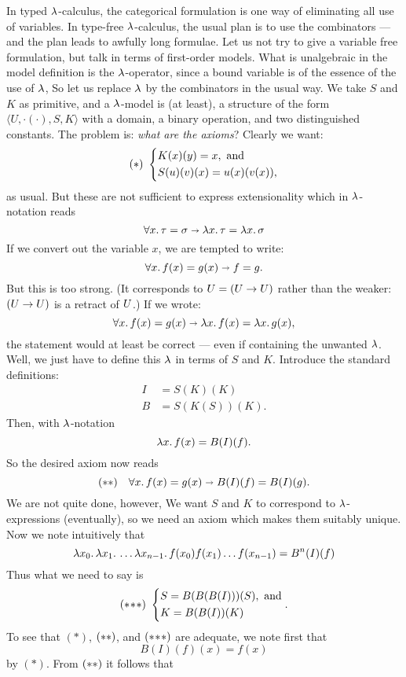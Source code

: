 In typed $\l$-calculus, the categorical formulation is one way of eliminating all use of
variables. In type-free $\l$-calculus, the usual plan is to use the combinators --- and
the plan leads to awfully long formulae. Let us not try to give a variable free
formulation, but talk in terms of first-order models. What is unalgebraic in the model
definition is the $\l$-operator, since a bound variable is of the essence of the use of
$\l$, So let us replace $\l$ by the combinators in the usual way. We take $S$ and $K$ as
primitive, and a $\l$-model is (at least), a structure of the form $\langle U,
\cdot(\cdot), S, K\rangle$ with a domain, a binary operation, and two distinguished
constants. The problem is: {\it what are the axioms}? Clearly we want:
%
\[
(*) \,\,
\begin{dcases}
K(x)(y) = x, {\textrm { and}}\\
S(u)(v)(x) = u(x)(v(x)),
\end{dcases}
\]
%
as usual. But these are not sufficient to express extensionality which in $\l$-notation
reads
$$
\forall x.\, \tau = \sigma \imp \lm{x}. \tau = \lm{x}. \sigma
$$
If we convert out the variable $x$, we are tempted to write:
$$
\forall x.\, f(x) = g(x) \imp f = g.
$$
But this is too strong. (It corresponds to $\U = (\U \to \U)$ rather than the weaker: $(\U
\to \U)$ is a retract of $\U$.) If we wrote:
$$
\forall x.\, f(x) = g(x) \imp \lm{x}.f(x) = \lm{x}.g(x),
$$
the statement would at least be correct --- even if containing the unwanted $\l$. Well, we
just have to define this $\l$ in terms of $S$ and $K$. Introduce the standard definitions:
\begin{align*}
I &= S(K)(K)\\
B &= S(K(S))(K).
\end{align*}
%
Then, with $\l$-notation
$$
\lm{x}.f(x) = B(I)(f).
$$
So the desired axiom now reads
$$
({\mathrm {**}}) \quad \forall x.\, f(x) = g(x) \imp B(I)(f) = B(I)(g).
$$
We are not quite done, however, We want $S$ and $K$ to correspond to $\l$-expressions
(eventually), so we need an axiom which makes them suitably unique. Now we note
intuitively that
$$
\lm{x_0}. \lm{x_1}. \dots \lm{x_{n-1}}. f(x_0)f(x_1)\dots f(x_{n-1}) = B^n(I)(f)
$$
Thus what we need to say is
\[
\sss \,\,
\begin{dcases}
S = B(B(B(I)))(S), {\textrm { and}}\\
K = B(B(I))(K)
\end{dcases} .
\]
To see that $(*)$, $\ss$, and $\sss$ are adequate, we note first that
$$
B(I)(f)(x) = f(x)
$$
by $(*)$. From $\ss$ it follows that
